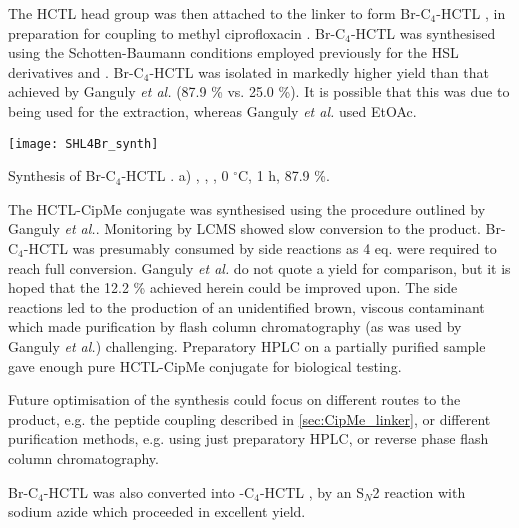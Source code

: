 The HCTL head group was then attached to the linker to form Br-C$_4$-HCTL , in preparation for coupling to methyl ciprofloxacin .
Br-C$_4$-HCTL  was synthesised using the Schotten-Baumann conditions employed previously for the HSL derivatives  and . Br-C$_4$-HCTL  was isolated in markedly higher yield than that achieved by Ganguly \textit{et al.}\cite{Ganguly2011} (87.9 \% vs. 25.0 \%). It is possible that this was due to  being used for the extraction, whereas Ganguly \textit{et al.} used EtOAc.

\begin{scheme}[H]
	\begin{center}
		\texttt{[image: SHL4Br\_synth]}
		\caption{Synthesis of Br-C$_4$-HCTL . a) , , , 0 $^{\circ}$C, 1 h, 87.9 \%.\label{sch:SHL4Br_synth}}
	\end{center}
\end{scheme}

The HCTL-CipMe conjugate  was synthesised using the procedure outlined by Ganguly \textit{et al.}\cite{Ganguly2011}. Monitoring by LCMS showed slow conversion to the product. Br-C$_4$-HCTL  was presumably consumed by side reactions as 4 eq. were required to reach full conversion. Ganguly \textit{et al.} do not quote a yield for comparison\cite{Ganguly2011}\cite{Iyer2012}, but it is hoped that the 12.2 \% achieved herein could be improved upon. The side reactions led to the production of an unidentified brown, viscous contaminant which made purification by flash column chromatography (as was used by Ganguly \textit{et al.}) challenging. Preparatory HPLC on a partially purified sample gave enough pure HCTL-CipMe conjugate  for biological testing. 

Future optimisation of the synthesis could focus on different routes to the product, e.g. the peptide coupling described in \ref{sec:CipMe_linker}, or different purification methods, e.g. using just preparatory HPLC, or reverse phase flash column chromatography.

Br-C$_4$-HCTL  was also converted into -C$_4$-HCTL , by an S$_N$2 reaction with sodium azide which proceeded in excellent yield. 


